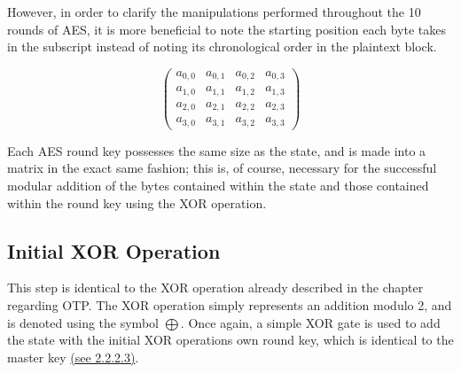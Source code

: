 \documentclass[12pt, a4paper]{report}
\theoremstyle{definition}
\theoremstyle{remark}
\begin{document}
However, in order to clarify the manipulations performed throughout the 10 rounds of AES, it is more beneficial to note the starting position each byte takes in the subscript instead of noting its chronological order in the plaintext block.

\[ \left( \begin{array}{cccc}
a_{0,0} & a_{0,1} & a_{0,2} & a_{0,3} \\
a_{1,0} & a_{1,1} & a_{1,2} & a_{1,3} \\
a_{2,0} & a_{2,1} & a_{2,2} & a_{2,3} \\
a_{3,0} & a_{3,1} & a_{3,2} & a_{3,3}\end{array} \right)\] 

Each AES round key possesses the same size as the state, and is made into a matrix in the exact same fashion; this is, of course, necessary for the successful modular addition of the bytes contained within the state and those contained within the round key using the XOR operation.


\subsection{Initial XOR Operation}
\label{InitXOR}

\begin{center}
\end{center}

This step is identical to the XOR operation already described in the chapter regarding OTP. The XOR operation simply represents an addition modulo 2, and is denoted using the symbol $\bigoplus$. Once again, a simple XOR gate is used to add the state with the initial XOR operations own round key, which is identical to the master key \hyperref[KeyExpansions]{(see 2.2.2.3)}.
\end{document}
